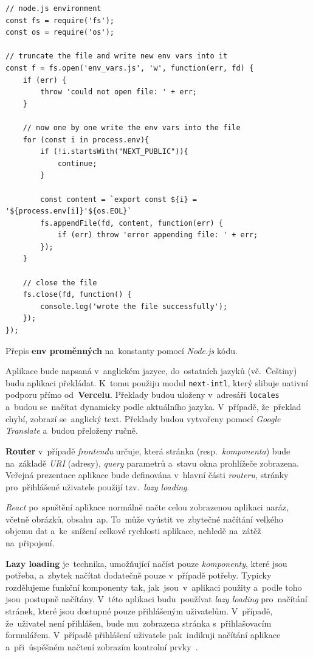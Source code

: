 \documentclass[11pt,a4paper]{report}
\begin{document}
            \begin{code}
                \begin{verbatim}
// node.js environment
const fs = require('fs');
const os = require('os');

// truncate the file and write new env vars into it
const f = fs.open('env_vars.js', 'w', function(err, fd) {
    if (err) {
        throw 'could not open file: ' + err;
    }

    // now one by one write the env vars into the file
    for (const i in process.env){
        if (!i.startsWith("NEXT_PUBLIC")){
            continue;
        }

        const content = `export const ${i} = '${process.env[i]}'${os.EOL}`
        fs.appendFile(fd, content, function(err) {
            if (err) throw 'error appending file: ' + err;
        });        
    }

    // close the file
    fs.close(fd, function() {
        console.log('wrote the file successfully');
    });
});
                \end{verbatim}
                \caption{Přepis \textbf{env proměnných} na~konstanty pomocí \emph{Node.js} kódu.}
                \label{js:env}
            \end{code}

            Aplikace bude napsaná v~anglickém jazyce, do~ostatních jazyků (vč.~Češtiny) budu aplikaci překládat. K~tomu použiju modul \texttt{next-intl}, který slibuje nativní podporu přímo od~\textbf{Vercelu}. Překlady budou uloženy v~adresáři \texttt{locales} a~budou se~načítat dynamicky podle aktuálního jazyka. V~případě, že~překlad chybí, zobrazí se~anglický text. Překlady budou vytvořeny pomocí \emph{Google Translate} a~budou přeloženy ručně.

            \textbf{Router} v~případě \emph{frontendu} určuje, která stránka (resp.~\emph{komponenta}) bude na~základě \emph{URI} (adresy), \emph{query} parametrů a~stavu okna prohlížeče zobrazena. Veřejná prezentace aplikace bude definována v~hlavní části \emph{routeru}, stránky pro~přihlášené uživatele použijí tzv.~\emph{lazy loading}.

            \emph{React} po~spuštění aplikace normálně načte celou zobrazenou aplikaci naráz, včetně obrázků, obsahu~ap. To~může vyústit ve~zbytečné načítání velkého objemu dat a~ke~snížení celkové rychlosti aplikace, nehledě na~zátěž na~připojení.

            \textbf{Lazy loading} je~technika, umožňující načíst pouze \emph{komponenty}, které jsou potřeba, a~zbytek načítat dodatečně pouze v~případě potřeby. Typicky rozdělujeme funkční komponenty tak, jak~jsou~v~aplikaci použity a~podle toho jsou~postupně načítány. V~této aplikaci budu~používat \emph{lazy loading} pro~načítání stránek, které jsou dostupné pouze přihlášeným uživatelům. V~případě, že~uživatel není přihlášen, bude mu~zobrazena stránka s~přihlašovacím formulářem. V~případě přihlášení uživatele pak~indikuji načítání aplikace a~při~úspěšném načtení zobrazím kontrolní prvky~\cite{lazyload}.
\end{document}
